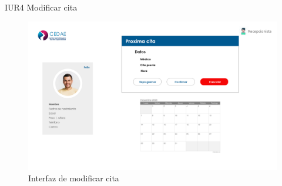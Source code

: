 \documentclass[12pt,letterpaper]{article}
\begin{document}
        IUR4 Modificar cita
            \begin{figure}[H]
                \centering
                \includegraphics [scale=0.18]{interfaces/rec_modificar_cita}
                \caption{Interfaz de modificar cita}
            \end{figure}
            
        \newpage
\end{document}
